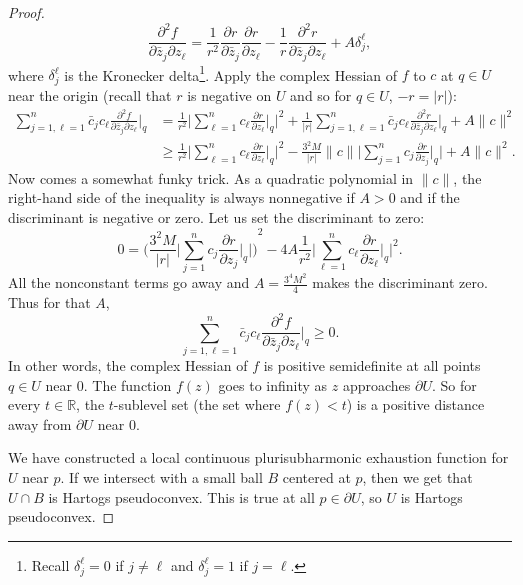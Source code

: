 \documentclass[12pt,openany]{book}
\newcommand{\sabs}[1]{\lvert {#1} \rvert}
\newcommand{\snorm}[1]{\lVert {#1} \rVert}
\newcommand{\BBabs}[1]{\Biggl\lvert {#1} \Biggr\rvert}
\newcommand{\R}{{\mathbb{R}}}
\theoremstyle{plain}
\theoremstyle{remark}
\theoremstyle{definition}
\theoremstyle{exercise}
\theoremstyle{example}
\begin{document}
\begin{proof}
\begin{equation*}
\frac{\partial^2 f}{\partial \bar{z}_j \partial z_\ell}
=
\frac{1}{r^2}
\frac{\partial r}{\partial \bar{z}_j}
\frac{\partial r}{\partial z_\ell}
-
\frac{1}{r}
\frac{\partial^2 r}{\partial \bar{z}_j \partial z_\ell} 
+
A\delta_{j}^{\ell} ,
\end{equation*}
where $\delta_j^\ell$ is the Kronecker delta\footnote{%
Recall $\delta_j^\ell = 0$ if $j\not= \ell$ and $\delta_j^\ell = 1$ if $j =
\ell$.}.
Apply the complex Hessian of $f$ to $c$ at $q \in U$ near the origin
(recall that $r$ is negative on $U$ and so for $q \in U$, $-r = \sabs{r}$):
\begin{equation*}
\begin{split}
\sum_{j=1,\ell=1}^n
\bar{c}_j c_\ell \frac{\partial^2 f}{\partial \bar{z}_j \partial z_\ell} \Big|_q 
& =
\frac{1}{r^2}
\BBabs{
\sum_{\ell=1}^n
c_\ell
\frac{\partial r}{\partial z_\ell} \Big|_q
}^2
+
\frac{1}{\sabs{r}}
\sum_{j=1,\ell=1}^n
\bar{c}_j
c_\ell
\frac{\partial^2 r}{\partial \bar{z}_j \partial z_\ell} \Big|_q
+
A \snorm{c}^2
\\
& \geq
\frac{1}{r^2}
\BBabs{
\sum_{\ell=1}^n
c_\ell
\frac{\partial r}{\partial z_\ell} \Big|_q
}^2
-
\frac{3^2 M}{\sabs{r}}
\snorm{c}\BBabs{\sum_{j=1}^n c_j \frac{\partial r}{\partial z_j} \Big|_q} 
+
A \snorm{c}^2 .
\end{split}
\end{equation*}
Now comes a somewhat funky trick.
As a quadratic polynomial in $\snorm{c}$, the right-hand side of the
inequality
is always nonnegative if $A > 0$ and if the discriminant is negative or zero.
Let us set the discriminant to zero:
\begin{equation*}
0 = 
{\Biggl(
\frac{3^2 M}{\sabs{r}}
\BBabs{\sum_{j=1}^n c_j \frac{\partial r}{\partial z_j} \Big|_q}
\Biggr)}^2
- 4A 
\frac{1}{r^2}
\BBabs{
\sum_{\ell=1}^n
c_\ell
\frac{\partial r}{\partial z_\ell} \Big|_q
}^2 .
\end{equation*}
All the nonconstant terms go away and 
$A=\frac{3^4 M^2}{4}$ makes the discriminant zero.  Thus for that $A$,
\begin{equation*}
\sum_{j=1,\ell=1}^n
\bar{c}_j c_\ell \frac{\partial^2 f}{\partial \bar{z}_j \partial z_\ell} \Big|_q 
\geq 0.
\end{equation*}
In other words, the complex Hessian
of $f$ is positive semidefinite at all points $q \in U$ near $0$.
The function $f(z)$ goes to infinity as $z$ approaches $\partial U$.
So for every $t \in \R$, the $t$-sublevel set
(the set where $f(z) < t$) is a positive
distance away from $\partial U$ near $0$.

We have constructed a local continuous plurisubharmonic
exhaustion function for $U$ near $p$.  If we intersect
with a small ball $B$ centered at $p$, then we get that $U \cap B$ is
Hartogs pseudoconvex.  This is true at all
$p \in \partial U$, so $U$ is Hartogs pseudoconvex.
\end{proof}
\end{document}
